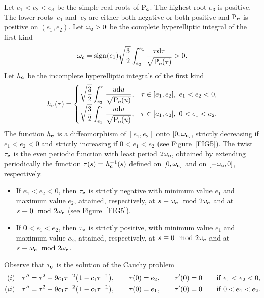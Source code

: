 \documentclass[pdftex]{sigma}
\numberwithin{equation}{section}
\begin{document}
Let $e_1<e_2<e_3$ be the simple real roots of ${\rm P}_{{\bf c}}$. The highest root $e_3$ is positive.
The lower roots~$e_1$ and~$e_2$ are either both negative or both positive and ${\rm P}_{{\bf c}}$ is positive on $(e_1,e_2)$.
Let $\omega_{{\bf c}}>0$ be the complete hyperelliptic integral of the first kind
\begin{equation}\label{halfpB1}
 \omega_{{\bf c}} ={\rm sign}(e_1) \sqrt{\frac{3}{2}}\int_{e_2}^{e_1}\frac{\tau {\rm d}\tau}{\sqrt{{\rm P}_{{\bf c}}(\tau)}}>0.
 \end{equation}
Let $h_{{\bf c}}$ be the incomplete hyperelliptic integrals of the first kind
\[
 h_{{\bf c}}(\tau) =
\begin{cases} \displaystyle \sqrt{\frac{3}{2}}\int_{e_2}^{\tau}\frac{u{\rm d}u}{\sqrt{{\rm P}_{{\bf c}}(u)}}, & \tau\in [e_1,e_2], \ e_1<e_2<0,\\
 \displaystyle \sqrt{\frac{3}{2}}\int_{e_1}^{\tau}\frac{u {\rm d}u}{\sqrt{{\rm P}_{{\bf c}}(u)}},& \tau\in [e_1,e_2],\  0<e_1<e_2.
\end{cases}
 \]
The function $h_{{\bf c}}$ is a diffeomorphism of $[e_1,e_2]$ onto $[0,\omega_{{\bf c}}]$, strictly decreasing if $e_1<e_2<0$ and strictly
increasing if $0<e_1<e_2$ (see Figure~\ref{FIG5}). The twist $\tau_{{\bf c}}$ is the even periodic function with least period $2\omega_{{\bf c}}$, {obtained by extending periodically the function
$\tau(s) = h_{{\bf c}}^{-1}(s)$ defined on $[0,\omega_{{\bf c}}]$ and on $[-\omega_{{\bf c}},0]$, respectively.}
\begin{itemize}\itemsep=0pt
\item If $e_1<e_2<0$, then $\tau_{{\bf c}}$ is strictly negative with minimum value $e_1$ and maximum value $e_2$, attained, respectively, at $s\equiv \omega_{{\bf c}}\mod 2\omega_{{\bf c}}$ and at $s\equiv 0\mod 2\omega_{{\bf c}}$ (see Figure~\ref{FIG5}).
\item If $0<e_1<e_2$, then $\tau_{{\bf c}}$ is strictly positive, with minimum value $e_1$ and maximum value $e_2$, attained, respectively, {at} $s\equiv 0\mod 2\omega_{{\bf c}}$ and at $s\equiv \omega_{{\bf c}}\mod 2\omega_{{\bf c}}$.
\end{itemize}
Observe that $\tau_{{\bf c}}$ is the solution of the Cauchy problem
\begin{gather}\label{twistnB1'}
\begin{split}
(i)\quad &{\tau''}=\tau^2-9c_1\tau^{-2}\big(1-c_1\tau^{-1}\big),\qquad \tau(0)=e_2,\qquad {\tau'}(0)=0 \qquad {\rm if}\ e_1<e_2<0,\\
(ii)\quad &{\tau''}=\tau^2-9c_1\tau^{-2}\big(1-c_1\tau^{-1}\big),\qquad \tau(0)=e_1,\qquad {\tau'}(0)=0 \qquad {\rm if}\ 0<e_1<e_2.
 \end{split}
 \end{gather}
\end{document}
